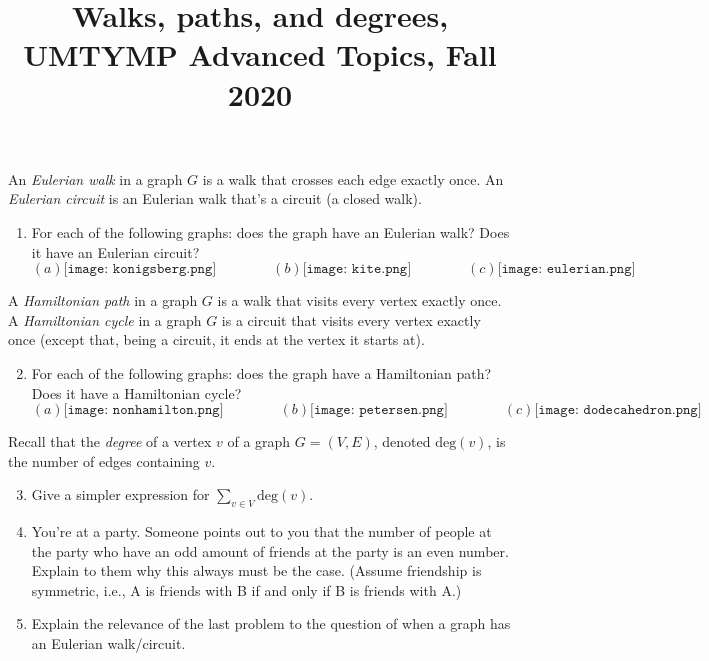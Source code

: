 \documentclass[11pt]{article}
\title{Walks, paths, and degrees, \\ UMTYMP Advanced Topics, Fall 2020}
\date{}
\begin{document}
\maketitle



An \emph{Eulerian walk} in a graph $G$ is a walk that crosses each edge exactly once. An \emph{Eulerian circuit} is an Eulerian walk that's a circuit (a closed walk).

\begin{enumerate}

\item For each of the following graphs: does the graph have an Eulerian walk? Does it have an Eulerian circuit?
\[ (a) \texttt{[image: konigsberg.png]} \qquad \qquad (b) \texttt{[image: kite.png]} \qquad \qquad (c) \texttt{[image: eulerian.png]} \]

\end{enumerate}

A \emph{Hamiltonian path} in a graph $G$ is a walk that visits every vertex exactly once. A \emph{Hamiltonian cycle} in a graph $G$ is a circuit that visits every vertex exactly once (except that, being a circuit, it ends at the vertex it starts at).

\begin{enumerate}

\setcounter{enumi}{1}

\item For each of the following graphs: does the graph have a Hamiltonian path? Does it have a Hamiltonian cycle?
\[ (a) \texttt{[image: nonhamilton.png]} \qquad \qquad (b) \texttt{[image: petersen.png]} \qquad \qquad (c) \texttt{[image: dodecahedron.png]}  \]

\end{enumerate}

\pagebreak


Recall that the \emph{degree} of a vertex $v$ of a graph $G=(V,E)$, denoted $\mathrm{deg}(v)$, is the number of edges containing $v$.
\begin{enumerate}

\setcounter{enumi}{2}

\item Give a simpler expression for $\sum_{v\in V}\mathrm{deg}(v)$.

\item You're at a party. Someone points out to you that the number of people at the party who have an odd amount of friends at the party is an even number. Explain to them why this always must be the case. (Assume friendship is symmetric, i.e., A is friends with B if and only if B is friends with A.)

\item Explain the relevance of the last problem to the question of when a graph has an Eulerian walk/circuit.

\end{enumerate}
\end{document}
